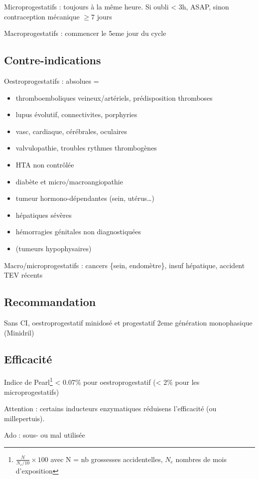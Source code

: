 \documentclass{book}
\begin{document}
Microprogestatifs : toujours à la même heure. Si oubli < 3h, ASAP, sinon
contraception mécanique \(\ge 7\) jours

Macroprogestatifs : commencer le 5eme jour du cycle

\subsection{Contre-indications}
\label{sec:org464d2d4}
Oestroprogestatifs : absolues =
\begin{itemize}
\item thromboemboliques veineux/artériels, prédisposition thromboses
\item lupus évolutif, connectivites, porphyries
\item vasc, cardiaque, cérébrales, oculaires
\item valvulopathie, troubles rythmes thrombogènes
\item HTA non contrôlée
\item diabète et micro/macroangiopathie
\item tumeur hormono-dépendantes (sein, utérus\ldots{})
\item hépatiques sévères
\item hémorragies génitales non diagnostiquées
\item (tumeurs hypophysaires)
\end{itemize}
Macro/microprogestatifs : cancers \{sein, endomètre\}, insuf hépatique, accident
TEV récents

\subsection{Recommandation}
\label{sec:orgae7164f}
Sans CI, oestroprogestatif minidosé et progestatif 2eme génération monophasique
(Minidril)

\subsection{Efficacité}
\label{sec:orgb0de7f6}
Indice de Pearl\footnote{\(\frac{N}{N_e/10}\times 100\) avec N = nb grossesses
accidentelles, \(N_e\) nombres de mois d'exposition} < 0.07\% pour oestroprogestatif
(< 2\% pour les microprogestatifs)

Attention : certains inducteurs enzymatiques réduisens l'efficacité (ou
millepertuis).

Ado : sous- ou mal utilisée
\end{document}
